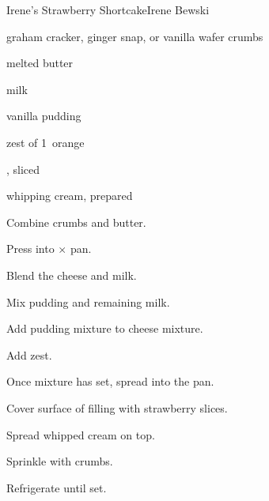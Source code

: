 \begin{recipe}{Irene's Strawberry Shortcake}{Irene Bewski}{}

\begin{ingredients}
\item \C{2\half} graham cracker, ginger snap, or vanilla wafer crumbs
\item \C{\half} melted butter
\item {} 
\item \C{1\threequarter} milk
\item \oz{3\quarter} vanilla pudding
\item zest of 1~orange
\item {} , sliced 
\item whipping cream, prepared 
\end{ingredients}

\begin{directions}
\item Combine crumbs and butter.
\item Press into $\times$ pan.
\item Blend the cheese and \C{\half} milk.
\item Mix pudding and remaining milk.
\item Add pudding mixture to cheese mixture.
\item Add zest.
\item Once mixture has set, spread into the pan.
\item Cover surface of filling with strawberry slices.
\item Spread whipped cream on top.
\item Sprinkle with crumbs.
\item Refrigerate until set.
\end{directions}

\end{recipe}
